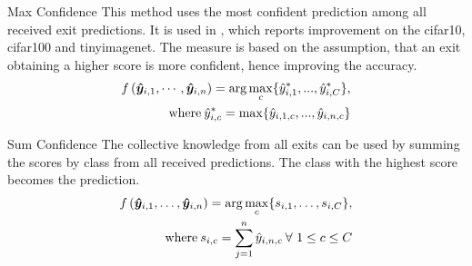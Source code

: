 \begin{enumdescript}
\begin{enumdescript}
			\item[Max Confidence] This method uses the most confident prediction among all received exit predictions. It is used in \cite{kaya_shallow-deep_nodate}, which reports improvement on the \gls{cifar10}, \gls{cifar100} and \gls{tinyimagenet}. The measure is based on the assumption, that an exit obtaining a higher score is more confident, hence improving the accuracy.
			\begin{align}
			\begin{split}
			f\left(\bm{\hat{y}}_{i,1}, \cdots, \bm{\hat{y}}_{i,n} \right) =  \arg \underset{c}{\max} \{\hat{y}^*_{i,1}, ..., \hat{y}^*_{i,C} \},
			\\ \text{where\:} \hat{y}^*_{i,c} = \max \{\hat{y}_{i,1,c}, ..., \hat{y}_{i,n,c}\}
			\end{split}	
			\end{align}
			\item[Sum Confidence] The collective knowledge from all exits can be used by summing the scores by class from all received predictions. The class with the highest score becomes the prediction.
			\begin{align}
			\begin{split}
			f\left(\bm{\hat{y}}_{i,1}, \dots, \bm{\hat{y}}_{i,n} \right) = \arg \underset{c}{\max} \{s_{i,1}, \dots, s_{i,C}\}, \\ \text{where\:} s_{i,c} = \sum_{j=1}^{n}\hat{y}_{i,n,c}\: \forall \ 1\le c \le C
			\end{split}
			\end{align}
			
			

\end{enumdescript}
\end{enumdescript}
